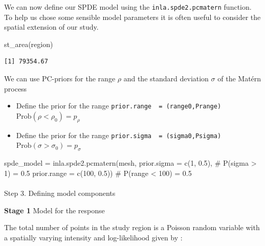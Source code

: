 \documentclass[
  letterpaper,
  DIV=11,
  numbers=noendperiod]{scrartcl}
\makeatletter
\let\oldparagraph\paragraph
\renewcommand{\paragraph}{
    \@ifstar
      \xxxParagraphStar
      \xxxParagraphNoStar
  }
\newcommand{\xxxParagraphStar}[1]{\oldparagraph*{#1}\mbox{}}
\newcommand{\xxxParagraphNoStar}[1]{\oldparagraph{#1}\mbox{}}
\newenvironment{Shaded}{\begin{snugshade}}{\end{snugshade}}
\newcommand{\AttributeTok}[1]{\textcolor[rgb]{0.40,0.45,0.13}{#1}}
\newcommand{\CommentTok}[1]{\textcolor[rgb]{0.37,0.37,0.37}{#1}}
\newcommand{\DecValTok}[1]{\textcolor[rgb]{0.68,0.00,0.00}{#1}}
\newcommand{\FloatTok}[1]{\textcolor[rgb]{0.68,0.00,0.00}{#1}}
\newcommand{\FunctionTok}[1]{\textcolor[rgb]{0.28,0.35,0.67}{#1}}
\newcommand{\NormalTok}[1]{\textcolor[rgb]{0.00,0.23,0.31}{#1}}
\newcommand{\OtherTok}[1]{\textcolor[rgb]{0.00,0.23,0.31}{#1}}
\makeatother
\begin{document}
We can now define our SPDE model using the \texttt{inla.spde2.pcmatern}
function. To help us chose some sensible model parameters it is often
useful to consider the spatial extension of our study.

\begin{Shaded}
\begin{Highlighting}[]
\FunctionTok{st\_area}\NormalTok{(region)}
\end{Highlighting}
\end{Shaded}

\begin{verbatim}
[1] 79354.67
\end{verbatim}

We can use PC-priors for the range \(\rho\) and the standard deviation
\(\sigma\) of the Matérn process

\begin{itemize}
\item
  Define the prior for the range
  \texttt{prior.range\ \ =\ (range0,Prange)}
  \(\text{Prob}(\rho<\rho_0) = p_{\rho}\)
\item
  Define the prior for the range
  \texttt{prior.sigma\ \ =\ (sigma0,Psigma)}
  \(\text{Prob}(\sigma>\sigma_0) = p_{\sigma}\)
\end{itemize}

\begin{Shaded}
\begin{Highlighting}[]
\NormalTok{spde\_model }\OtherTok{=}  \FunctionTok{inla.spde2.pcmatern}\NormalTok{(mesh,}
                       \AttributeTok{prior.sigma =} \FunctionTok{c}\NormalTok{(}\DecValTok{1}\NormalTok{, }\FloatTok{0.5}\NormalTok{), }\CommentTok{\# P(sigma \textgreater{} 1) = 0.5}
                       \AttributeTok{prior.range =} \FunctionTok{c}\NormalTok{(}\DecValTok{100}\NormalTok{, }\FloatTok{0.5}\NormalTok{)) }\CommentTok{\# P(range \textless{} 100) = 0.5}
\end{Highlighting}
\end{Shaded}

\paragraph{Step 3. Defining model
components}\label{step-3.-defining-model-components}

\textbf{Stage 1} Model for the response

The total number of points in the study region is a Poisson random
variable with a spatially varying intensity and log-likelihood given by
:
\end{document}
